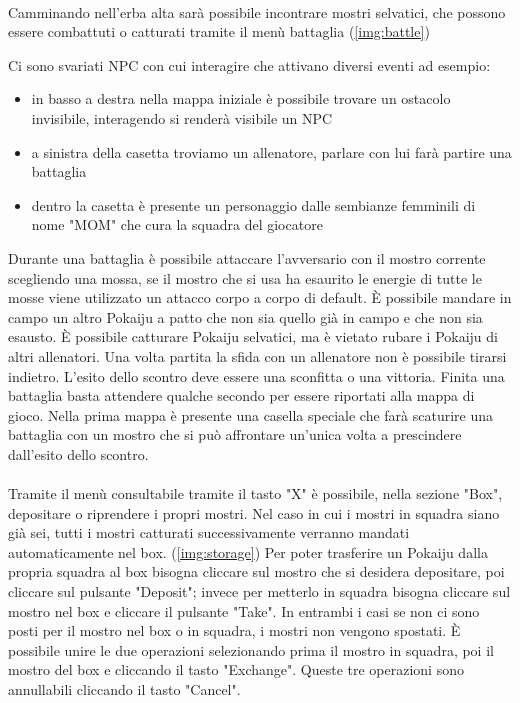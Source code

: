 \paragraph{}{
Camminando nell'erba alta sarà possibile incontrare mostri selvatici, che possono essere combattuti o catturati tramite il menù battaglia (\cref{img:battle})

Ci sono svariati NPC con cui interagire che attivano diversi eventi ad esempio:
\begin{itemize}
    \item in basso a destra nella mappa iniziale è possibile trovare un ostacolo invisibile, interagendo si renderà visibile un NPC
    \item a sinistra della casetta troviamo un allenatore, parlare con lui farà partire una battaglia
    \item dentro la casetta è presente un personaggio dalle sembianze femminili di nome "MOM" che cura la squadra del giocatore
\end{itemize}
Durante una battaglia è possibile attaccare l'avversario con il mostro corrente scegliendo una mossa, se il mostro che si usa ha  esaurito le energie di tutte le mosse viene utilizzato un attacco corpo a corpo di default. È possibile mandare in campo un altro Pokaiju a patto che non sia quello già in campo e che non sia esausto.
È possibile catturare Pokaiju selvatici, ma è vietato rubare i Pokaiju di altri allenatori.
Una volta partita la sfida con un allenatore non è possibile tirarsi indietro. L'esito dello scontro deve essere una sconfitta o una vittoria.
Finita una battaglia basta attendere qualche secondo per essere riportati alla mappa di gioco.
Nella prima mappa è presente una casella speciale che farà scaturire una battaglia con un mostro che si può affrontare un'unica volta a prescindere dall'esito dello scontro.
}

\paragraph{}{
Tramite il menù consultabile tramite il tasto "X" è possibile, nella sezione "Box", depositare o riprendere i propri mostri. Nel caso in cui i mostri in squadra siano già sei, tutti i mostri catturati successivamente verranno mandati automaticamente nel box. (\cref{img:storage})
Per poter trasferire un Pokaiju dalla propria squadra al box bisogna cliccare sul mostro che si desidera depositare, poi cliccare sul pulsante "Deposit"; invece per metterlo in squadra bisogna cliccare sul mostro nel box e cliccare il pulsante "Take".
In entrambi i casi se non ci sono posti per il mostro nel box o in squadra, i mostri non vengono spostati.
È possibile unire le due operazioni selezionando prima il mostro in squadra, poi il mostro del box e cliccando il tasto "Exchange".
Queste tre operazioni sono annullabili cliccando il tasto "Cancel".
}

